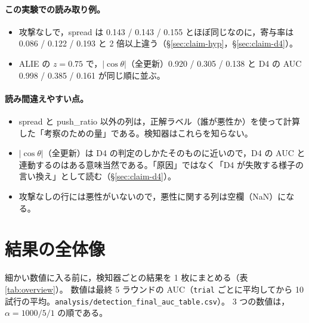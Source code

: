 \documentclass[a4j, dvipdfmx]{jsarticle}  %
\begin{document}
\paragraph{この実験での読み取り例。}
\begin{itemize}
  \item 攻撃なしで，spread は 0.143 / 0.143 / 0.155 とほぼ同じなのに，寄与率は 0.086 / 0.122 / 0.193 と 2 倍以上違う（\S\ref{sec:claim-hyp}，\S\ref{sec:claim-d4}）。
  \item ALIE の $z = 0.75$ で，$|\cos\theta|$（全更新）0.920 / 0.305 / 0.138 と D4 の AUC 0.998 / 0.385 / 0.161 が同じ順に並ぶ。
\end{itemize}

\paragraph{読み間違えやすい点。}
\begin{itemize}
  \item spread と push\_ratio 以外の列は，正解ラベル（誰が悪性か）を使って計算した「考察のための量」である。検知器はこれらを知らない。
  \item $|\cos\theta|$（全更新）は D4 の判定のしかたそのものに近いので，D4 の AUC と連動するのはある意味当然である。「原因」ではなく「D4 が失敗する様子の言い換え」として読む（\S\ref{sec:claim-d4}）。
  \item 攻撃なしの行には悪性がいないので，悪性に関する列は空欄（NaN）になる。
\end{itemize}

\section{結果の全体像}
\label{sec:claims-overview}

細かい数値に入る前に，検知器ごとの結果を 1 枚にまとめる（表\ref{tab:overview}）。
数値は最終 5 ラウンドの AUC（\texttt{trial} ごとに平均してから 10 試行の平均。\texttt{analysis/detection\_final\_auc\_table.csv}）。
3 つの数値は，$\alpha = 1000 / 5 / 1$ の順である。
\end{document}
